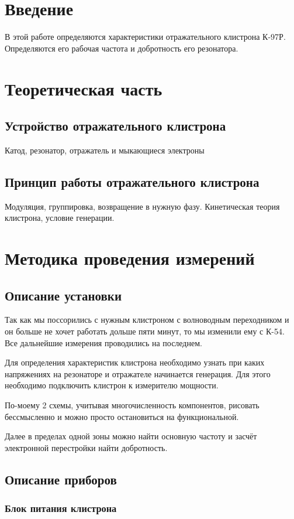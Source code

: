 \documentclass[a4paper]{article}
\begin{document}
	\section*{Введение}
	В этой работе определяются характеристики отражательного клистрона К-97Р. Определяются его рабочая частота и добротность его резонатора.
	
	\section{Теоретическая часть}
	\subsection{Устройство отражательного клистрона}
	Катод, резонатор, отражатель и мыкающиеся электроны
	\subsection{Принцип работы отражательного клистрона}
	Модуляция, группировка, возвращение в нужную фазу. Кинетическая теория клистрона, условие генерации.
	
	\section{Методика проведения измерений}
	\subsection{Описание установки}
	Так как мы поссорились с нужным клистроном с волноводным переходником и он больше не хочет работать дольше пяти минут, то мы изменили ему с К-54. Все дальнейшие измерения проводились на последнем.

	Для определения характеристик клистрона необходимо узнать при каких напряжениях на резонаторе и отражателе начинается генерация. Для этого необходимо подключить клистрон к измерителю мощности.

	По-моему 2 схемы, учитывая многочисленность компонентов, рисовать бессмысленно и можно просто остановиться на функциональной.

	Далее в пределах одной зоны можно найти основную частоту и засчёт электронной перестройки найти добротность.
	
	\subsection{Описание приборов}
	\subsubsection{Блок питания клистрона}
\end{document}
